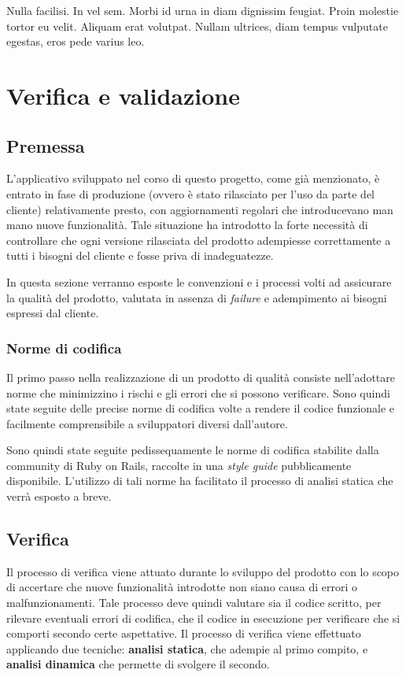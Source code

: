 

\begin{savequote}[75mm]
Nulla facilisi. In vel sem. Morbi id urna in diam dignissim feugiat. Proin molestie tortor eu velit. Aliquam erat volutpat. Nullam ultrices, diam tempus vulputate egestas, eros pede varius leo.
\end{savequote}

\chapter{Verifica e validazione}
\label{chap5}
\section{Premessa}
L'applicativo sviluppato nel corso di questo progetto, come già menzionato, è entrato in fase di produzione (ovvero è stato rilasciato per l'uso da parte del cliente) relativamente presto, con aggiornamenti regolari che introducevano man mano nuove funzionalità. Tale situazione ha introdotto la forte necessità di controllare che ogni versione rilasciata del prodotto adempiesse correttamente a tutti i bisogni del cliente e fosse priva di inadeguatezze.

In questa sezione verranno esposte le convenzioni e i processi volti ad assicurare la qualità del prodotto, valutata in assenza di \textit{failure} e adempimento ai bisogni espressi dal cliente.
\subsection{Norme di codifica}
Il primo passo nella realizzazione di un prodotto di qualità consiste nell'adottare norme che minimizzino i rischi e gli errori che si possono verificare. Sono quindi state seguite delle precise norme di codifica volte a rendere il codice funzionale e facilmente comprensibile a sviluppatori diversi dall'autore.

Sono quindi state seguite pedissequamente le norme di codifica stabilite dalla community di Ruby on Rails, raccolte in una \textit{style guide} pubblicamente disponibile. L'utilizzo di tali norme ha facilitato il processo di analisi statica che verrà esposto a breve.
\section{Verifica}
Il processo di verifica viene attuato durante lo sviluppo del prodotto con lo scopo di accertare che nuove funzionalità introdotte non siano causa di errori o malfunzionamenti. Tale processo deve quindi valutare sia il codice scritto, per rilevare eventuali errori di codifica, che il codice in esecuzione per verificare che si comporti secondo certe aspettative. Il processo di verifica viene effettuato applicando due tecniche: \textbf{analisi statica}, che adempie al primo compito, e \textbf{analisi dinamica} che permette di svolgere il secondo.
